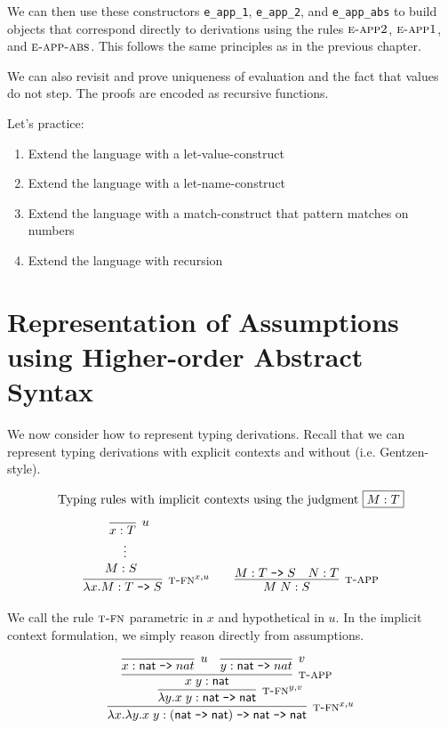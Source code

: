We can then use these constructors \lstinline!e_app_1!,
\lstinline!e_app_2!, and \lstinline!e_app_abs! to build objects that
correspond directly to derivations using the rules $\textsc{e-app2}$,
$\textsc{e-app1}$, and  $\textsc{e-app-abs}$. This follows the same principles as in the
previous chapter.

We can also revisit and prove uniqueness of evaluation and the fact that values
do not step. The proofs are encoded as recursive functions.

Let's practice:

\begin{enumerate}
\item Extend the language with a let-value-construct
\item Extend the language with a let-name-construct
\item Extend the language with a match-construct that pattern matches on numbers
\item Extend the language with recursion
\end{enumerate}



\section{Representation of Assumptions using Higher-order Abstract Syntax}
We now consider how to represent typing derivations. Recall that we can
represent typing derivations with explicit contexts and without
(i.e. Gentzen-style).

\[
\begin{array}{c}
\multicolumn{1}{l}{\mbox{Typing rules with implicit contexts using the judgment \fbox{$M:T$}}} \\[1em]
\infer[\TFn^{x,u}]{\lambda x.M : T \arrow S}{
  \begin{array}{c}
  \infer[u]{x:T}{} \\
  \vdots~~\\
  M : S~~~~
  \end{array}
}
\qquad
\infer[\TApp]{M\;N : S}{M : T \arrow S & N:T}
\end{array}
\]

We call the rule $\textsc{t-fn}$ parametric in $x$ and hypothetical in $u$.
In the implicit context formulation, we simply reason directly from
assumptions.


\[
\infer[\TFn^{x,u}]{\lambda x. \lambda y. x\;y : (\nat \arrow \nat) \arrow \nat \arrow \nat}
{\infer[\TFn^{y,v}]{\lambda y.x\;y : \nat \arrow \nat}{
 \infer[\TApp]{x\;y : \nat}
   {\infer[u]{x:\nat \arrow nat}{} &
    \infer[v]{y:\nat \arrow nat}{}
   }
 }
}
\]

